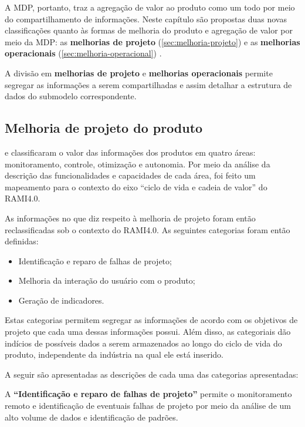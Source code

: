 A MDP, portanto, traz a agregação de valor ao produto como um todo por meio do compartilhamento de informações. Neste capítulo são propostas duas novas classificações quanto às formas de melhoria do produto e agregação de valor por meio da MDP: as \textbf{melhorias de projeto} (\autoref{sec:melhoria-projeto}) e as \textbf{melhorias operacionais} (\autoref{sec:melhoria-operacional}) .

A divisão em \textbf{melhorias de projeto} e \textbf{melhorias operacionais} permite segregar as informações a serem compartilhadas e assim detalhar a estrutura de dados do submodelo correspondente.

\subsection{Melhoria de projeto do produto}
\label{sec:melhoria-projeto}

 e  classificaram o valor das informações dos produtos em quatro áreas: monitoramento, controle, otimização e autonomia. Por meio da análise da descrição das funcionalidades e capacidades de cada área, foi feito um mapeamento para o contexto do eixo ``ciclo de vida e cadeia de valor'' do RAMI4.0.

As informações no que diz respeito à melhoria de projeto foram então reclassificadas sob o contexto do RAMI4.0. As seguintes categorias foram então definidas:

\begin{itemize}
	\item Identificação e reparo de falhas de projeto;
	\item Melhoria da interação do usuário com o produto;
	\item Geração de indicadores.
\end{itemize}

Estas categorias permitem segregar as informações de acordo com os objetivos de projeto que cada uma dessas informações possui. Além disso, as categoriais dão indícios de possíveis dados a serem armazenados ao longo do ciclo de vida do produto, independente da indústria na qual ele está inserido.

A seguir são apresentadas as descrições de cada uma das categorias apresentadas:

A \textbf{``Identificação e reparo de falhas de projeto''} permite o monitoramento remoto e identificação de eventuais falhas de projeto por meio da análise de um alto volume de dados e identificação de padrões.

